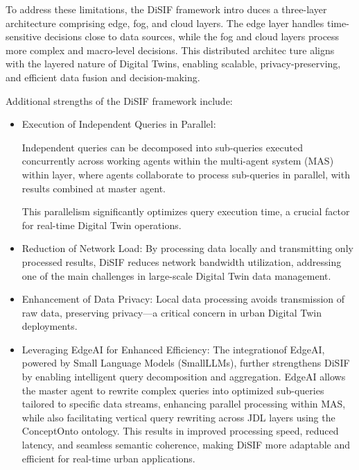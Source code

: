 \documentclass[5p,times]{elsarticle}
\begin{document}
  To address these limitations, the DiSIF framework intro
  duces a three-layer architecture comprising edge, fog, and cloud
   layers. The edge layer handles time-sensitive decisions close
   to data sources, while the fog and cloud layers process more
   complex and macro-level decisions. This distributed architec
  ture aligns with the layered nature of Digital Twins,
   enabling scalable, privacy-preserving, and efficient data fusion
   and decision-making.


   Additional strengths of the DiSIF framework include:

   \begin{itemize}

   \item Execution of Independent Queries in Parallel: 
   
   Independent queries can be decomposed into sub-queries executed 
   concurrently across working agents within the multi-agent system (MAS) within layer,
    where agents collaborate to process sub-queries in parallel, 
    with results combined at master agent.

   This parallelism significantly optimizes query execution time, a crucial factor for real-time
 Digital Twin operations.

 \item Reduction of Network Load: By processing data locally
 and transmitting only processed results, DiSIF reduces
 network bandwidth utilization, addressing one of the main
 challenges in large-scale Digital Twin data management.
 
 \item Enhancement of Data Privacy: Local data processing
 avoids transmission of raw data, preserving privacy—a
 critical concern in urban Digital Twin deployments.

 \item Leveraging EdgeAI for Enhanced Efficiency: 
  The integrationof EdgeAI, powered by Small Language Models (SmallLLMs), further 
  strengthens DiSIF by enabling intelligent query decomposition and aggregation.
   EdgeAI allows the master agent to rewrite complex queries into optimized
    sub-queries tailored to specific data streams, enhancing parallel processing
     within MAS, while also facilitating vertical query rewriting across JDL 
     layers using the ConceptOnto ontology. This results in improved processing 
     speed, reduced latency, and seamless semantic coherence, making DiSIF more
  adaptable and efficient for real-time urban applications.

   \end{itemize}
\end{document}
